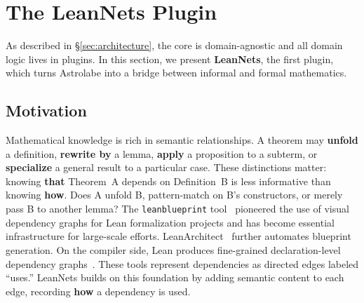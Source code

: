 \section{The LeanNets Plugin}
\label{sec:plugins}

As described in \S\ref{sec:architecture}, the core is domain-agnostic and all domain logic lives in plugins. In this section, we present \textbf{LeanNets}, the first plugin, which turns Astrolabe into a bridge between informal and formal mathematics.

\subsection{Motivation}

Mathematical knowledge is rich in semantic relationships. A theorem may \textbf{unfold} a definition, \textbf{rewrite by} a lemma, \textbf{apply} a proposition to a subterm, or \textbf{specialize} a general result to a particular case. These distinctions matter: knowing \textbf{that} Theorem~A depends on Definition~B is less informative than knowing \textbf{how}. Does A unfold B, pattern-match on B's constructors, or merely pass B to another lemma? The \texttt{leanblueprint} tool~\cite{Massot2020} pioneered the use of visual dependency graphs for Lean formalization projects and has become essential infrastructure for large-scale efforts. LeanArchitect~\cite{Zhu2026} further automates blueprint generation. On the compiler side, Lean produces fine-grained declaration-level dependency graphs~\cite{LiPengSeverini2026}. These tools represent dependencies as directed edges labeled ``uses.'' LeanNets builds on this foundation by adding semantic content to each edge, recording \textbf{how} a dependency is used.

